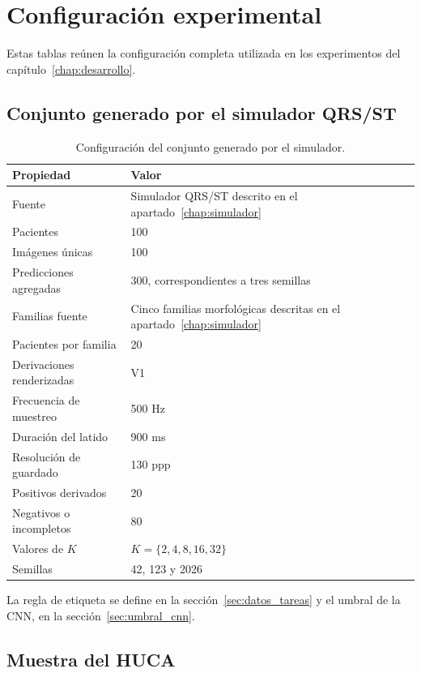 \chapter{Configuración experimental}
\label{app:configuracion}

Estas tablas reúnen la configuración completa utilizada en los experimentos del capítulo~\ref{chap:desarrollo}.

\section{Conjunto generado por el simulador QRS/ST}

\begin{table}[H]
  \centering
  \small
  \begin{tabularx}{0.94\textwidth}{p{4.4cm}X}
    \toprule
    Propiedad & Valor \\
    \midrule
    Fuente & Simulador QRS/ST descrito en el apartado~\ref{chap:simulador} \\
    Pacientes & 100 \\
    Imágenes únicas & 100 \\
    Predicciones agregadas & 300, correspondientes a tres semillas \\
    Familias fuente & Cinco familias morfológicas descritas en el apartado~\ref{chap:simulador} \\
    Pacientes por familia & 20 \\
    Derivaciones renderizadas & V1 \\
    Frecuencia de muestreo & 500 Hz \\
    Duración del latido & 900 ms \\
    Resolución de guardado & 130 ppp \\
    Positivos derivados & 20 \\
    Negativos o incompletos & 80 \\
    Valores de \(K\) & \(K=\{2,4,8,16,32\}\) \\
    Semillas & 42, 123 y 2026 \\
    \bottomrule
  \end{tabularx}
  \caption{Configuración del conjunto generado por el simulador.}
  \label{tab:config_sintetico_final}
\end{table}

La regla de etiqueta se define en la sección~\ref{sec:datos_tareas} y el umbral de la CNN, en la sección~\ref{sec:umbral_cnn}.

\clearpage
\section{Muestra del HUCA}

